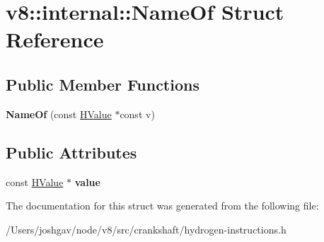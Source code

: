 \hypertarget{structv8_1_1internal_1_1_name_of}{}\section{v8\+:\+:internal\+:\+:Name\+Of Struct Reference}
\label{structv8_1_1internal_1_1_name_of}
\subsection*{Public Member Functions}
\begin{DoxyCompactItemize}
\item 
{\bfseries Name\+Of} (const \hyperlink{classv8_1_1internal_1_1_h_value}{H\+Value} $\ast$const v)\hypertarget{structv8_1_1internal_1_1_name_of_a966e665de668aa9a763dc6224b99ce20}{}\label{structv8_1_1internal_1_1_name_of_a966e665de668aa9a763dc6224b99ce20}

\end{DoxyCompactItemize}
\subsection*{Public Attributes}
\begin{DoxyCompactItemize}
\item 
const \hyperlink{classv8_1_1internal_1_1_h_value}{H\+Value} $\ast$ {\bfseries value}\hypertarget{structv8_1_1internal_1_1_name_of_ae83f6dad7226825fcc57894c14b07f0f}{}\label{structv8_1_1internal_1_1_name_of_ae83f6dad7226825fcc57894c14b07f0f}

\end{DoxyCompactItemize}


The documentation for this struct was generated from the following file\+:\begin{DoxyCompactItemize}
\item 
/\+Users/joshgav/node/v8/src/crankshaft/hydrogen-\/instructions.\+h\end{DoxyCompactItemize}
